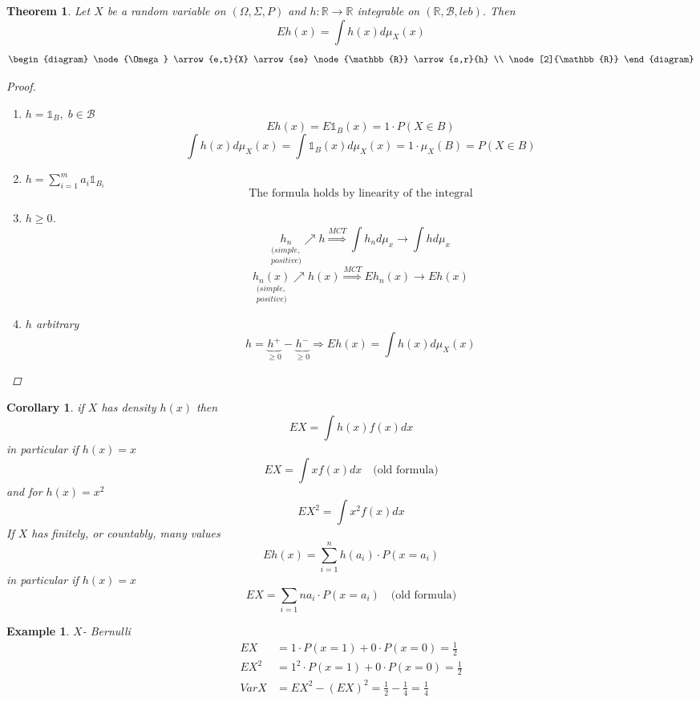 \documentclass[12pt]{article}
\def\RR{\mathbb{R}}
\newtheorem{theorem}{Theorem}[section]
\newtheorem{example}{Example}[section]
\newtheorem{corollary}{Corollary}[section]
\begin{document}
\begin{theorem} Let $X$ be a random variable on $(\Omega , \Sigma , P)$ and $h:\RR \rightarrow \RR$ integrable on $(\RR , \mathcal{B} , leb)$. Then 
\[Eh(x) = \int h(x) d\mu_X(x) \]
\[
\begin{diagram}
\node{\Omega} \arrow{e,t}{X}  \arrow{se}
\node{\RR}  \arrow{s,r}{h} \\
 \node[2]{\RR}
\end{diagram}
\]
\begin{proof}\quad \\
\begin{enumerate}
\item $h = {\mathbb 1}_B, \; b \in \mathcal{B}$
\[Eh(x) = E{\mathbb 1}_B(x) = 1\cdot P(X \in B)\]
\[\int h(x)d\mu_X(x) = \int {\mathbb 1}_B(x)d\mu_X(x) = 1 \cdot \mu_X(B) = P(X \in B)\]
\item $h = \sum_{i=1}^{m}a_i{\mathbb 1}_{B_i}$\\
\[\text{The formula holds by linearity of the integral}\]
\item $h\geq 0$.
\[\underset{positive)}{\underset{(simple,}{h_n}} \nearrow h \overset{MCT}{\Rightarrow} \int h_nd\mu_x \rightarrow \int hd\mu_x\]
\[\underset{positive)}{\underset{(simple,}{h_n(x)}} \nearrow h(x) \overset{MCT}{\Rightarrow} E h_n(x) \rightarrow Eh(x)\]
\item $h$ arbitrary
\[ h = \underbrace{h^{+}}_{\geq 0} -\underbrace{h^{-}}_{\geq 0} \Rightarrow Eh(x) = \int h(x)d\mu_X(x)\] 
\end{enumerate}
\end{proof}
\end{theorem}

\begin{corollary}
if $X$ has density $h(x)$ then 
\[EX = \int h(x)f(x)dx \]
in particular if $h(x) = x$
\[EX = \int xf(x)dx  \quad \text{(old formula)} \]
and for $h(x) = x^2$
\[EX^2 = \int x^2f(x)dx \]
If $X$ has finitely, or countably, many values 
\[Eh(x) = \sum_{i=1}^{n}h(a_i)\cdot P(x=a_i)\]
in particular if $h(x) = x$
\[EX = \sum_{i=1}{n}a_i\cdot P(x=a_i) \quad \text{(old formula)} \]
\end{corollary}

\begin{example} $X$- Bernulli
\begin{align*} EX &= 1\cdot P(x=1) + 0\cdot P(x=0) = \frac{1}{2}\\
 EX^2 &= 1^2\cdot P(x=1) + 0\cdot P(x=0) = \frac{1}{2}\\
 VarX &= EX^2 - (EX)^2= \frac{1}{2} - \frac{1}{4} = \frac{1}{4} \end{align*}
\end{example}
\end{document}
